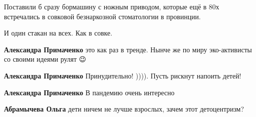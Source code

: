 \begin{itemize}
Поставили б сразу бормашину с ножным приводом, которые ещё в 80х встречались в
совковой безнаркозной стоматологии в провинции.

 
И один стакан на всех. Как в совке.

\begin{itemize}
 
\textbf{Александра Примаченко} это как раз в тренде. Нынче же по миру эко-активисты со своими идеями рулят 😉

 
\textbf{Александра Примаченко} Принудительно! )))). Пусть рискнут напоить детей!

 
\textbf{Александра Примаченко} В пандемию очень интересно

 
\textbf{Абрамычева Ольга} дети ничем не лучше взрослых, зачем этот детоцентризм?

 

\end{itemize}
\end{itemize}
